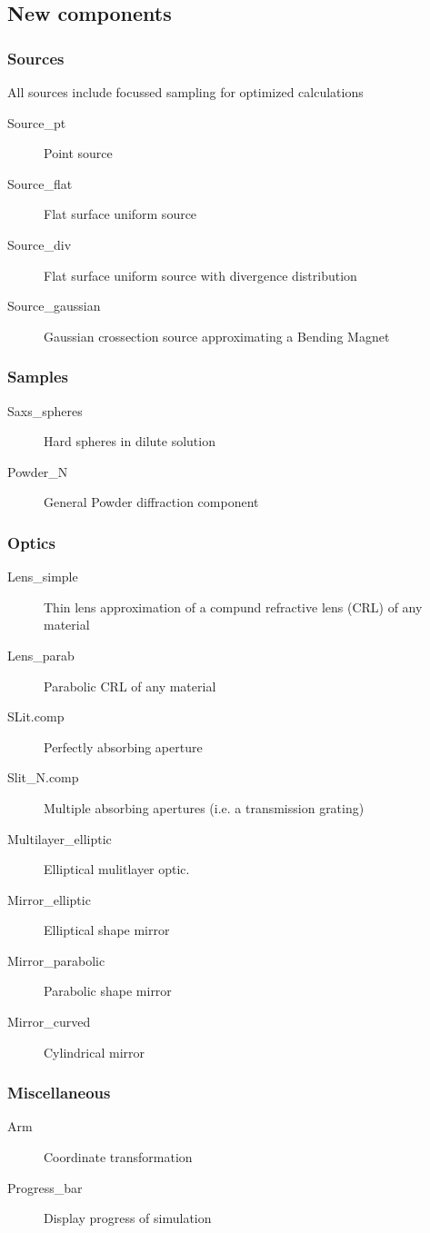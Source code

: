 \subsection{New components}

\subsubsection*{Sources}  
All sources include focussed sampling for optimized calculations
\begin{description}
\item[Source\_pt] Point source
\item[Source\_flat] Flat surface uniform source
\item[Source\_div] Flat surface uniform source with divergence distribution
\item[Source\_gaussian] Gaussian crossection source approximating a Bending Magnet
\end{description}
\subsubsection*{Samples}
\begin{description}
\item[Saxs\_spheres] Hard spheres in dilute solution
\item[Powder\_N] General Powder diffraction component
\end{description}
\subsubsection*{Optics}
\begin{description}
\item[Lens\_simple] Thin lens approximation of a compund refractive lens (CRL) of any material
\item[Lens\_parab] Parabolic CRL of any material
\item[SLit.comp] Perfectly absorbing aperture
\item[Slit\_N.comp] Multiple absorbing apertures (i.e. a transmission grating)
\item[Multilayer\_elliptic] Elliptical mulitlayer optic.
\item[Mirror\_elliptic] Elliptical shape mirror
\item[Mirror\_parabolic] Parabolic shape mirror
\item[Mirror\_curved] Cylindrical mirror
\end{description}
\subsubsection*{Miscellaneous}
\begin{description}
\item[Arm] Coordinate transformation
\item[Progress\_bar] Display progress of simulation
\end{description}
